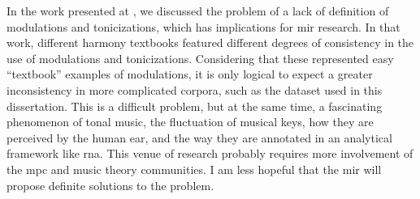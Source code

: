 
In the work presented at \textcite{napoleslopez2020local},
we discussed the problem of a lack of definition of
modulations and tonicizations, which has implications for
\gls{mir} research. In that work, different harmony
textbooks featured different degrees of consistency in the
use of modulations and tonicizations. Considering that these
represented  easy ``textbook'' examples of modulations, it
is only logical to expect a greater inconsistency in more
complicated corpora, such as the dataset used in this
dissertation. This is a difficult problem, but at the same
time, a fascinating phenomenon of tonal music, the
fluctuation of musical keys, how they are perceived by the
human ear, and the way they are annotated in an analytical
framework like \gls{rna}. This venue of research probably
requires more involvement of the \gls{mpc} and music theory
communities. I am less hopeful that the \gls{mir} will
propose definite solutions to the problem.

